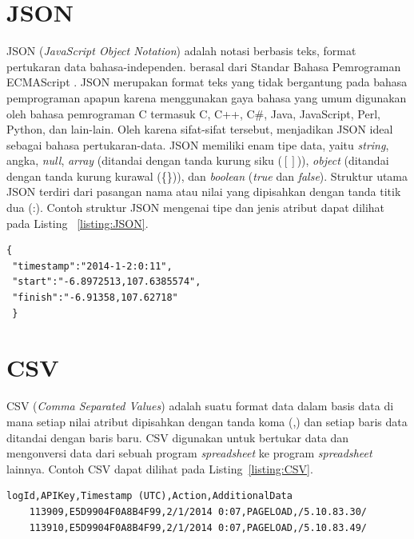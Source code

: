 \section{JSON}
\label{subsec:json}
JSON (\textit{JavaScript Object Notation}) adalah notasi berbasis teks,
   format pertukaran data bahasa-independen. berasal dari
   Standar Bahasa Pemrograman ECMAScript \cite{RFC:7159}. JSON merupakan format teks yang tidak bergantung pada bahasa pemprograman apapun karena menggunakan gaya bahasa yang umum digunakan oleh bahasa pemrograman C termasuk C, C++, C\#, Java, JavaScript, Perl, Python, dan lain-lain. Oleh karena sifat-sifat tersebut, menjadikan JSON ideal sebagai bahasa pertukaran-data. JSON memiliki enam tipe data, yaitu \textit{string}, angka, \textit{null}, \textit{array} (ditandai dengan tanda kurung siku ($\left [ \right ]$)), \textit{object} (ditandai dengan tanda kurung kurawal (\{\})), dan \textit{boolean} (\textit{true} dan \textit{false}). Struktur utama JSON terdiri dari pasangan nama atau nilai yang dipisahkan dengan tanda titik dua (:). Contoh struktur JSON mengenai tipe dan jenis atribut dapat dilihat pada Listing~ \ref{listing:JSON}.

\begin{lstlisting}[caption=Contoh Struktur JSON, label=listing:JSON]
 {
 "timestamp":"2014-1-2:0:11",
 "start":"-6.8972513,107.6385574",
 "finish":"-6.91358,107.62718"
 }
\end{lstlisting}

\section{CSV}
\label{subsec:csv}
CSV (\textit{Comma Separated Values}) adalah suatu format data dalam basis data di mana setiap nilai atribut dipisahkan dengan tanda koma (,) dan setiap baris data ditandai dengan baris baru.\cite{RFC:4180} CSV digunakan untuk bertukar data dan mengonversi data dari sebuah program \textit{spreadsheet} ke program \textit{spreadsheet} lainnya. Contoh CSV dapat dilihat pada Listing~\ref{listing:CSV}.

\begin{lstlisting}[caption=Contoh CSV, label=listing:CSV]
    logId,APIKey,Timestamp (UTC),Action,AdditionalData
    113909,E5D9904F0A8B4F99,2/1/2014 0:07,PAGELOAD,/5.10.83.30/
    113910,E5D9904F0A8B4F99,2/1/2014 0:07,PAGELOAD,/5.10.83.49/
\end{lstlisting}
	
